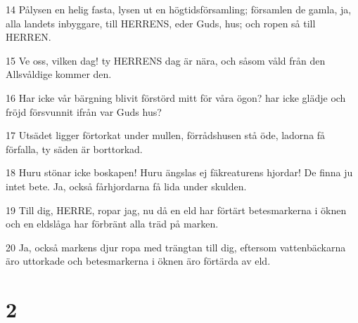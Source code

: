 \par 14 Pålysen en helig fasta, lysen ut en högtidsförsamling; församlen de gamla, ja, alla landets inbyggare, till HERRENS, eder Guds, hus; och ropen så till HERREN.
\par 15 Ve oss, vilken dag! ty HERRENS dag är nära, och såsom våld från den Allsvåldige kommer den.
\par 16 Har icke vår bärgning blivit förstörd mitt för våra ögon? har icke glädje och fröjd försvunnit ifrån var Guds hus?
\par 17 Utsädet ligger förtorkat under mullen, förrådshusen stå öde, ladorna få förfalla, ty säden är borttorkad.
\par 18 Huru stönar icke boskapen! Huru ängslas ej fäkreaturens hjordar! De finna ju intet bete. Ja, också fårhjordarna få lida under skulden.
\par 19 Till dig, HERRE, ropar jag, nu då en eld har förtärt betesmarkerna i öknen och en eldslåga har förbränt alla träd på marken.
\par 20 Ja, också markens djur ropa med trängtan till dig, eftersom vattenbäckarna äro uttorkade och betesmarkerna i öknen äro förtärda av eld.

\chapter{2}

